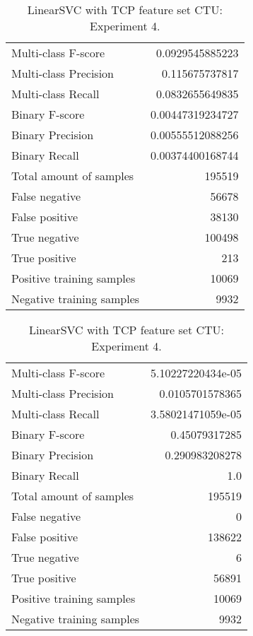 \begin{table}[H]
\begin{minipage}{0.5\textwidth}
\caption{LinearSVC with TCP feature set CTU: Experiment 3.}
\centering
\begin{tabular}{l r}
\toprule
Multi-class F-score & 0.0929545885223 \\
Multi-class Precision & 0.115675737817 \\
Multi-class Recall & 0.0832655649835 \\
\midrule
Binary F-score & 0.00447319234727 \\
Binary Precision & 0.00555512088256 \\
Binary Recall & 0.00374400168744 \\
\midrule
Total amount of samples & 195519 \\
False negative & 56678 \\
False positive & 38130 \\
True negative & 100498 \\
True positive & 213 \\
\midrule
Positive training samples & 10069 \\
Negative training samples & 9932 \\
\bottomrule
\end{tabular}
\end{minipage}
\hfillx
\begin{minipage}{0.5\textwidth}
\caption{LinearSVC with TCP feature set CTU: Experiment 4.}
\centering
\begin{tabular}{l r}
\toprule
Multi-class F-score & 5.10227220434e-05 \\
Multi-class Precision & 0.0105701578365 \\
Multi-class Recall & 3.58021471059e-05 \\
\midrule
Binary F-score & 0.45079317285 \\
Binary Precision & 0.290983208278 \\
Binary Recall & 1.0 \\
\midrule
Total amount of samples & 195519 \\
False negative & 0 \\
False positive & 138622 \\
True negative & 6 \\
True positive & 56891 \\
\midrule
Positive training samples & 10069 \\
Negative training samples & 9932 \\
\bottomrule
\end{tabular}
\end{minipage}
\end{table}
